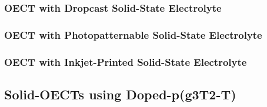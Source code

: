 \subsubsection{OECT with Dropcast Solid-State Electrolyte}

\subsubsection{OECT with Photopatternable Solid-State Electrolyte}

\subsubsection{OECT with Inkjet-Printed Solid-State Electrolyte}


\subsection{Solid-OECTs using Doped-p(g3T2-T)}





